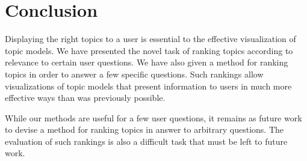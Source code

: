 \documentclass{article}
\begin{document}
\section{Conclusion}
\label{sec:conclusion}

Displaying the right topics to a user is essential to the effective
visualization of topic models.  We have presented the novel task of ranking
topics according to relevance to certain user questions.  We have also given a
method for ranking topics in order to answer a few specific questions.  Such
rankings allow visualizations of topic models that present information to users
in much more effective ways than was previously possible.

While our methods are useful for a few user questions, it remains as future
work to devise a method for ranking topics in answer to arbitrary questions.
The evaluation of such rankings is also a difficult task that must be left to
future work.  



\end{document}
